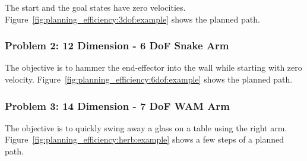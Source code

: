 \documentclass[letterpaper, 10 pt, conference]{ieeeconf}  %
\begin{document}
The start and the goal states have zero velocities.
Figure~\ref{fig:planning_efficiency:3dof:example} shows the planned path.

\subsubsection{Problem 2: 12 Dimension - 6 DoF Snake Arm}

The objective is to hammer the end-effector into the wall while starting with zero velocity.
Figure~\ref{fig:planning_efficiency:6dof:example} shows the planned path.

\subsubsection{Problem 3: 14 Dimension - 7 DoF WAM Arm}

The objective is to quickly swing away a glass on a table using the right arm.
Figure~\ref{fig:planning_efficiency:herb:example} shows a few steps of a planned path.
\end{document}
